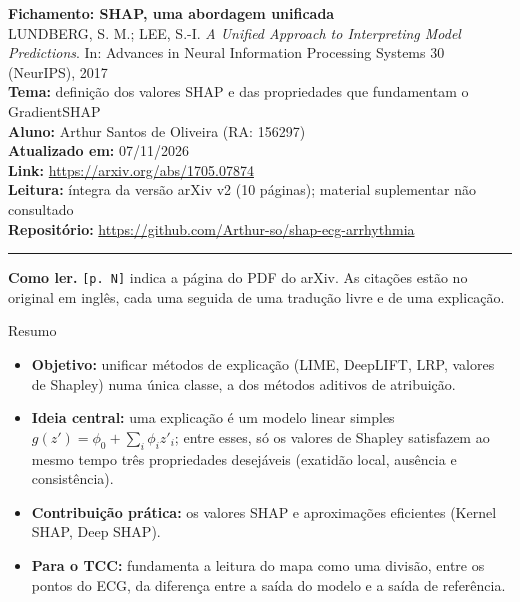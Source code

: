 \documentclass[11pt,a4paper]{article}
\begin{document}
\begin{center}
    {\LARGE \textbf{Fichamento: SHAP, uma abordagem unificada}} \\[0.35em]
    {\large LUNDBERG, S. M.; LEE, S.-I. \textit{A Unified Approach to Interpreting Model Predictions}. In: Advances in Neural Information Processing Systems 30 (NeurIPS), 2017} \\[0.3em]
    \textbf{Tema:} definição dos valores SHAP e das propriedades que fundamentam o GradientSHAP \\[0.2em]
    \textbf{Aluno:} Arthur Santos de Oliveira (RA: 156297) \\[0.2em]
    \textbf{Atualizado em:} 07/11/2026 \\[0.2em]
    \textbf{Link:} \url{https://arxiv.org/abs/1705.07874} \\[0.2em]
    \textbf{Leitura:} íntegra da versão arXiv v2 (10 páginas); material suplementar não consultado \\[0.2em]
    \textbf{Repositório:} \url{https://github.com/Arthur-so/shap-ecg-arrhythmia}
\end{center}
\vspace{-0.5em}
\hrule
\vspace{0.8em}

\textbf{Como ler.} \texttt{[p. N]} indica a página do PDF do arXiv. As citações estão no original em inglês, cada uma seguida de uma tradução livre e de uma explicação.

\begin{infobox}[note]{Resumo}
\begin{itemize}
\item \textbf{Objetivo:} unificar métodos de explicação (LIME, DeepLIFT, LRP, valores de Shapley) numa única classe, a dos métodos aditivos de atribuição.
\item \textbf{Ideia central:} uma explicação é um modelo linear simples $g(z') = \phi_0 + \sum_i \phi_i z'_i$; entre esses, só os valores de Shapley satisfazem ao mesmo tempo três propriedades desejáveis (exatidão local, ausência e consistência).
\item \textbf{Contribuição prática:} os valores SHAP e aproximações eficientes (Kernel SHAP, Deep SHAP).
\item \textbf{Para o TCC:} fundamenta a leitura do mapa como uma divisão, entre os pontos do ECG, da diferença entre a saída do modelo e a saída de referência.
\end{itemize}
\end{infobox}
\end{document}
